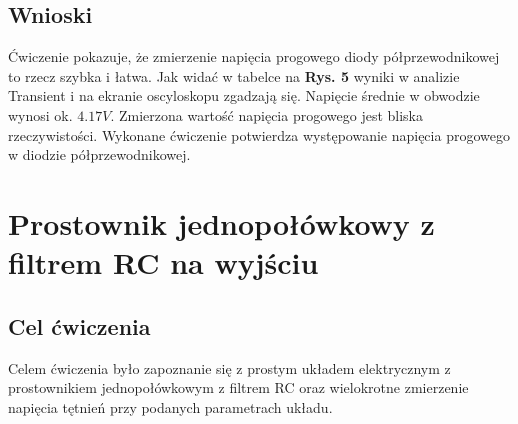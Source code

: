 \documentclass[11pt]{article}
\begin{document}
\subsection{Wnioski}
Ćwiczenie pokazuje, że zmierzenie napięcia progowego diody półprzewodnikowej to rzecz szybka i łatwa. Jak widać w tabelce na \textbf{Rys. 5} wyniki w analizie Transient i na ekranie oscyloskopu zgadzają się. Napięcie średnie w obwodzie wynosi ok. $4.17 V$. Zmierzona wartość napięcia progowego jest bliska rzeczywistości. Wykonane ćwiczenie potwierdza
występowanie napięcia progowego w diodzie półprzewodnikowej.
\section{Prostownik jednopołówkowy z filtrem RC na wyjściu}
\subsection{Cel ćwiczenia}
Celem ćwiczenia było zapoznanie się z prostym układem elektrycznym z prostownikiem jednopołówkowym z filtrem RC oraz wielokrotne zmierzenie napięcia tętnień przy podanych parametrach układu.
\end{document}
